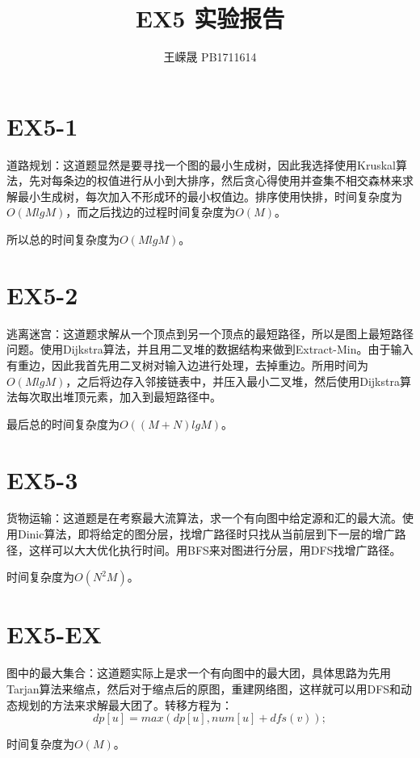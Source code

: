 \documentclass[11pt,a4paper]{article}
\title{EX5 实验报告}
\author{王嵘晟 \quad PB1711614}
\date{}
\begin{document}
	\maketitle
	\section*{EX5-1}
	\par{道路规划：这道题显然是要寻找一个图的最小生成树，因此我选择使用Kruskal算法，先对每条边的权值进行从小到大排序，然后贪心得使用并查集不相交森林来求解最小生成树，每次加入不形成环的最小权值边。排序使用快排，时间复杂度为$O(MlgM)$，而之后找边的过程时间复杂度为$O(M)$。}
	\par{所以总的时间复杂度为$O(MlgM)$。}
	\section*{EX5-2}
	\par{逃离迷宫：这道题求解从一个顶点到另一个顶点的最短路径，所以是图上最短路径问题。使用Dijkstra算法，并且用二叉堆的数据结构来做到Extract-Min。由于输入有重边，因此我首先用二叉树对输入边进行处理，去掉重边。所用时间为$O(MlgM)$，之后将边存入邻接链表中，并压入最小二叉堆，然后使用Dijkstra算法每次取出堆顶元素，加入到最短路径中。}
	\par{最后总的时间复杂度为$O((M+N)lgM)$。}
	\section*{EX5-3}
	\par{货物运输：这道题是在考察最大流算法，求一个有向图中给定源和汇的最大流。使用Dinic算法，即将给定的图分层，找增广路径时只找从当前层到下一层的增广路径，这样可以大大优化执行时间。用BFS来对图进行分层，用DFS找增广路径。}
	\par{时间复杂度为$O(N^{2}M)$。}
	\section*{EX5-EX}
	\par{图中的最大集合：这道题实际上是求一个有向图中的最大团，具体思路为先用Tarjan算法来缩点，然后对于缩点后的原图，重建网络图，这样就可以用DFS和动态规划的方法来求解最大团了。转移方程为：$$dp[u] = max(dp[u], num[u]+dfs(v));$$}
	\par{时间复杂度为$O(M)$。}
\end{document}
